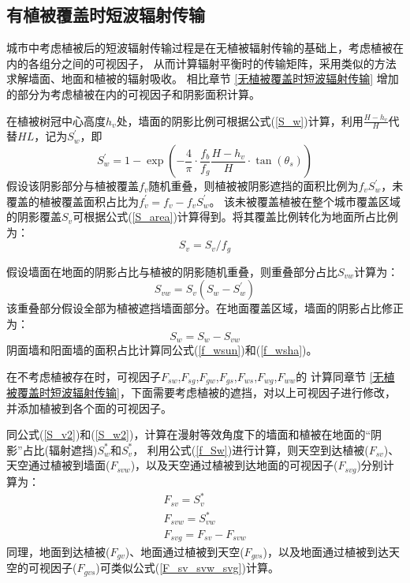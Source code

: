 \subsection{有植被覆盖时短波辐射传输}\label{有植被覆盖时短波辐射传输}
城市中考虑植被后的短波辐射传输过程是在无植被辐射传输的基础上，考虑植被在内的各组分之间的可视因子，
从而计算辐射平衡时的传输矩阵，采用类似的方法求解墙面、地面和植被的辐射吸收。
相比章节 \ref{无植被覆盖时短波辐射传输} 增加的部分为考虑植被在内的可视因子和阴影面积计算。

在植被树冠中心高度$h_v$处，墙面的阴影比例可根据公式(\ref{S_w})计算，利用$\frac{H-h_v}{H}$代替$HL$，记为$S_w^\prime$，即
\begin{equation}
S_{w}^{\prime}=1-\exp \left(-\frac{4}{\pi} \cdot \frac{f_{b}}{f_{g}} \frac{H-h_{v}}{H} \cdot \tan \left(\theta_{s}\right)\right)
\end{equation}
假设该阴影部分与植被覆盖$f_v$随机重叠，则植被被阴影遮挡的面积比例为$f_vS_w^\prime$，未覆盖的植被覆盖面积占比为$f_v^\prime=f_v-f_vS_w^\prime$。
该未被覆盖植被在整个城市覆盖区域的阴影覆盖$S_v$可根据公式(\ref{S_area})计算得到。将其覆盖比例转化为地面所占比例为：
\begin{equation}\label{S_v2}
S_{v}=S_{v} / f_{g}
\end{equation}

假设墙面在地面的阴影占比与植被的阴影随机重叠，则重叠部分占比$S_{vw}$计算为：
\begin{equation}
S_{v w}=S_{v}\left(S_{w}-S_{w}^{\prime}\right)
\end{equation}
该重叠部分假设全部为植被遮挡墙面部分。在地面覆盖区域，墙面的阴影占比修正为：
\begin{equation}\label{S_w2}
S_{w}=S_{w}-S_{v w}
\end{equation}
阴面墙和阳面墙的面积占比计算同公式(\ref{f_wsun})和(\ref{f_wsha})。

在不考虑植被存在时，可视因子$F_{sw}$,$F_{sg}$,$F_{gw}$,$F_{gs}$,$F_{ws}$,$F_{wg}$,$F_{ww}$的
计算同章节 \ref{无植被覆盖时短波辐射传输}，下面需要考虑植被的遮挡，对以上可视因子进行修改，并添加植被到各个面的可视因子。

同公式(\ref{S_v2})和(\ref{S_w2})，计算在漫射等效角度下的墙面和植被在地面的“阴影”占比(辐射遮挡)$S_w^\ast$和$S_v^\ast$，
利用公式(\ref{f_Sw})进行计算，则天空到达植被($F_{sv}$)、天空通过植被到墙面($F_{svw}$)，以及天空通过植被到达地面的可视因子($F_{svg}$)分别计算为：
\begin{equation}\label{F_sv_svw_svg}
\begin{array}{c}F_{s v}=S_{v}^{*} \\ F_{s v w}=S_{v w}^{*} \\ F_{s v g}=F_{s v}-F_{s v w}\end{array}
\end{equation}
同理，地面到达植被($F_{gv}$)、地面通过植被到天空($F_{gvs}$)，以及地面通过植被到达天空的可视因子($F_{gvs}$)可类似公式(\ref{F_sv_svw_svg})计算。


